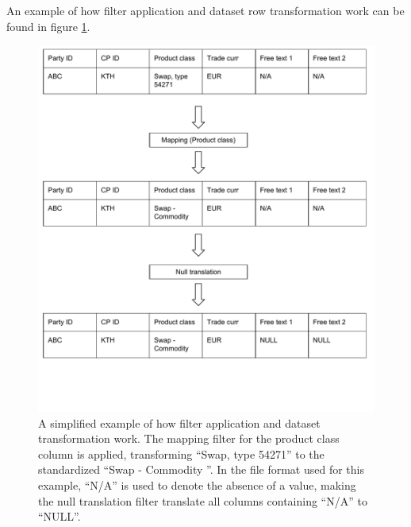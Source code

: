 An example of how filter application and dataset row transformation work can be found in figure \ref{fig:filter_diagram}.

\begin{figure}[ht]
  \centering
  \includegraphics[width=120mm]{figures/filter_diagram.pdf}
  \caption[Filter application example.]{A simplified example of how filter application and dataset transformation work. The mapping filter for the
  product class column is applied, transforming ``Swap, type 54271'' to the standardized ``Swap - Commodity ''. In the file format used for this example,
  ``N/A'' is used to denote the absence of a value, making the null translation filter translate all columns containing ``N/A'' to ``NULL''.}
  \label{fig:filter_diagram}
\end{figure}

